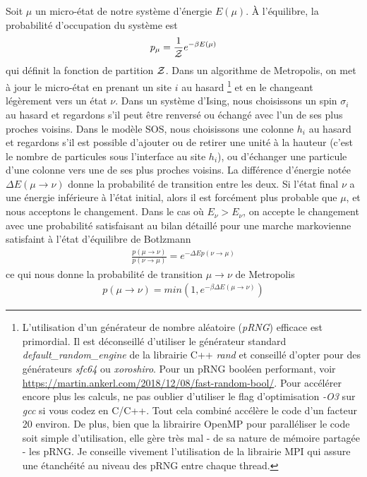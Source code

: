 Soit $\mu$ un micro-état de notre système d'énergie $E(\mu)$. À l'équilibre, la probabilité d'occupation du système est
\begin{align}
	p_\mu = \frac{1}{\mathcal{Z}} e^{-\beta E(\mu)}
\end{align}
qui définit la fonction de partition $\mathcal{Z}$. Dans un algorithme de Metropolis, on met à jour le micro-état en prenant un site $i$ au hasard
\footnote{L'utilisation d'un générateur de nombre aléatoire (\textit{pRNG}) efficace est primordial. Il est déconseillé d'utiliser le générateur standard \textit{default\_random\_engine} de la librairie C++ \textit{rand} et conseillé d'opter pour des générateurs \textit{sfc64} ou \textit{xoroshiro}. Pour un pRNG booléen performant, voir \url{https://martin.ankerl.com/2018/12/08/fast-random-bool/}. Pour accélérer encore plus les calculs, ne pas oublier d'utiliser le flag d'optimisation \textit{-O3}  sur \textit{gcc} si vous codez en C/C++. Tout cela combiné accélère le code d'un facteur 20 environ. \newline
De plus, bien que la librairire OpenMP pour paralléliser le code soit simple d'utilisation, elle gère très mal - de sa nature de mémoire partagée - les pRNG. Je conseille vivement l'utilisation de la librairie MPI qui assure une étanchéité au niveau des pRNG entre chaque thread.} 
et en le changeant légèrement vers un état $\nu$. Dans un système d'Ising, nous choisissons un spin $\sigma_i$ au hasard et regardons s'il peut être renversé ou échangé avec l'un de ses plus proches voisins. Dans le modèle SOS, nous choisissons une colonne $h_i$ au hasard et regardons s'il est possible d'ajouter ou de retirer une unité à la hauteur (c'est le nombre de particules sous l'interface au site $h_i$), ou d'échanger une particule d'une colonne vers une de ses plus proches voisins.
La différence d'énergie notée $\Delta E(\mu \rightarrow \nu)$ donne la probabilité de transition entre les deux. Si l'état final $\nu$ a une énergie inférieure à l'état initial, alors il est forcément plus probable que $\mu$, et nous acceptons le changement. Dans le cas où $E_\nu \greater E_\nu$, on accepte le changement avec une probabilité satisfaisant au bilan détaillé pour une marche markovienne satisfaint à l'état d'équilibre de Botlzmann
\begin{align}
\frac{p(\mu \rightarrow \nu)}{p(\nu \rightarrow \mu)} = e^{-\Delta Ep(\nu \rightarrow \mu)}
\end{align}
ce qui nous donne la probabilité de transition $\mu \to \nu$ de Metropolis
\begin{align}
	p(\mu \rightarrow \nu) = min(1,e^{-\beta \Delta E(\mu \rightarrow \nu)})
\end{align}
